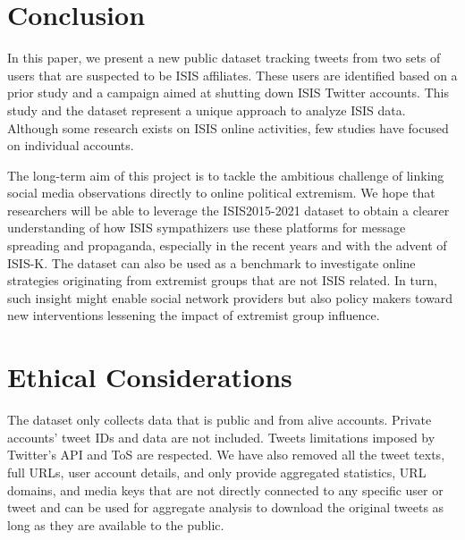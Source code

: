 \documentclass[letterpaper]{article} %
\begin{document}

\section{Conclusion}


 In this paper, we present a new public dataset tracking
  tweets from two sets of users that are suspected to be ISIS affiliates. These users are identified based on a prior study and a campaign aimed at shutting down ISIS Twitter accounts.
 This study and the dataset represent a unique approach to analyze ISIS data. Although some research exists on ISIS online activities, few studies have focused on individual accounts. 

The long-term aim of this project is to tackle the ambitious challenge of linking social media observations directly
to online political extremism. We hope that researchers will be able to
leverage the ISIS2015-2021 dataset to obtain a clearer understanding  of
how ISIS sympathizers use these platforms for message spreading and propaganda, especially in the recent years and with the advent of ISIS-K.  The dataset can also be used as a benchmark to investigate online strategies   originating from   extremist groups that are  not ISIS related. 
 In turn, such insight might enable  social network providers but also policy makers toward new interventions lessening the impact of extremist group influence.

\section{Ethical Considerations}
The dataset only collects data that is public and from alive accounts. Private accounts' tweet IDs and data are not included. Tweets limitations imposed by Twitter's API and ToS are respected. We have also removed all the tweet texts, full URLs, user account details, and only provide aggregated statistics, URL domains, and media keys that are not directly connected to any specific user or tweet and can be used for aggregate analysis to download the original tweets as long as they are available to the public. 



% 

\end{document}

